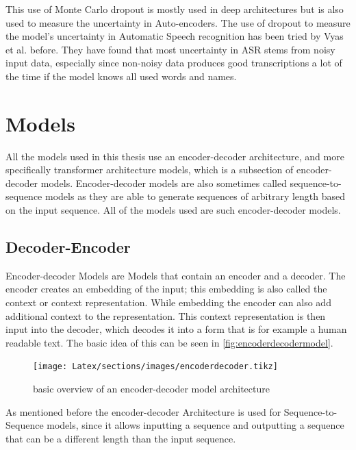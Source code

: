 This use of Monte Carlo dropout is mostly used in deep architectures but is also used to measure the uncertainty in Auto-encoders. \cite{gawlikowski2022surveyuncertaintydeepneural}
The use of dropout to measure the model's uncertainty in Automatic Speech recognition has been tried by Vyas et al. \cite{8683086} before.
They have found that most uncertainty in ASR stems from noisy input data, especially since non-noisy data produces good transcriptions a lot of the time if the model knows all used words and names. 

\section{Models}
\label{ch:models}
All the models used in this thesis use an encoder-decoder architecture, and more specifically transformer architecture models, which is a subsection of encoder-decoder models. Encoder-decoder models are also sometimes called sequence-to-sequence models as they are able to generate sequences of arbitrary length based on the input sequence.
All of the models used are such encoder-decoder models. 

\subsection{Decoder-Encoder}

Encoder-decoder Models are Models that contain an encoder and a decoder. The encoder creates an embedding of the input; this embedding is also called the context or context representation. While embedding the encoder can also add additional context to the representation. 
This context representation is then input into the decoder, which decodes it into a form that is for example a human readable text. 
The basic idea of this can be seen in \autoref{fig:encoderdecodermodel}.
\begin{figure}[ht]
    \centering%
    \texttt{[image: Latex/sections/images/encoderdecoder.tikz]}
    \caption{basic overview of an encoder-decoder model architecture}
    \label{fig:encoderdecodermodel}
\end{figure}

As mentioned before the encoder-decoder Architecture is used for Sequence-to-Sequence models, since it allows inputting a sequence and outputting a sequence that can be a different length than the input sequence. \cite[chapter~8.7]{jm3}

